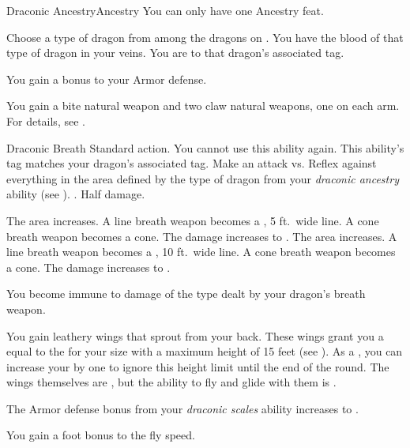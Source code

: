   \begin{feat}{Draconic Ancestry}{Ancestry}
     You can only have one Ancestry feat.

     Choose a type of dragon from among the dragons on .
    You have the blood of that type of dragon in your veins.
    You are  to that dragon's associated tag.

     You gain a  bonus to your Armor defense.

     You gain a bite natural weapon and two claw natural weapons, one on each arm.
    For details, see .

    \begin{activeability}{Draconic Breath}
      \abilityusagetime Standard action.
      \abilitycost You  cannot use this ability again.
      \rankline
      This ability's tag matches your dragon's associated tag.
      Make an attack vs. Reflex against everything in the area defined by the type of dragon from your \textit{draconic ancestry} ability (see ).
      \hit \damagerankthree{}.
      \miss Half damage.

      \rankline
       The area increases.
      A line breath weapon becomes a \arealarge, 5 ft.\ wide line.
      A cone breath weapon becomes a \areamed cone.
       The damage increases to \damagerankfive{}.
       The area increases.
      A line breath weapon becomes a \areahuge, 10 ft.\ wide line.
      A cone breath weapon becomes a \arealarge cone.
       The damage increases to \damagerankseven{}.
    \end{activeability}

     You become immune to damage of the type dealt by your dragon's breath weapon.

     You gain leathery wings that sprout from your back.
    These wings grant you a  equal to the  for your size with a maximum height of 15 feet (see ).
    As a , you can increase your  by one to ignore this height limit until the end of the round.
    The wings themselves are , but the ability to fly and glide with them is \magical.

     The Armor defense bonus from your \textit{draconic scales} ability increases to .

     You gain a  foot bonus to the fly speed.
  \end{feat}


